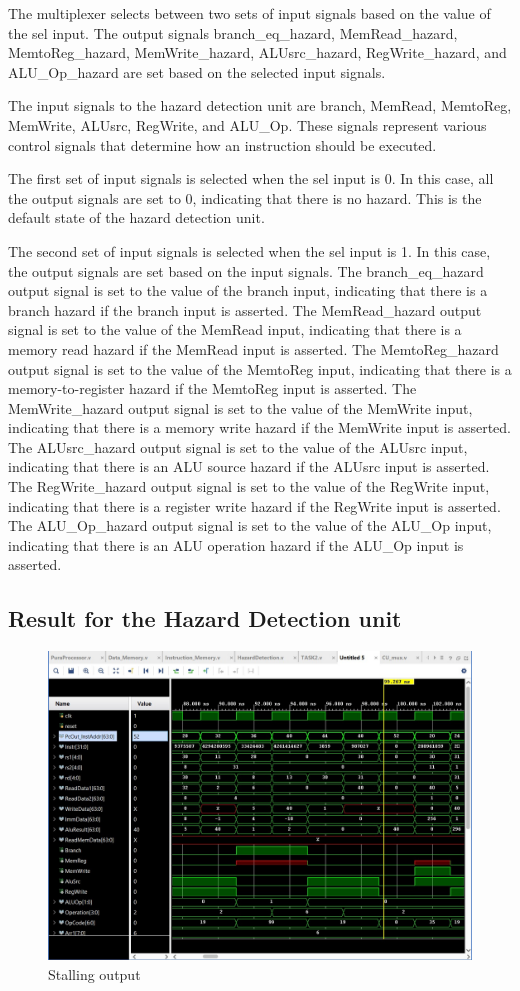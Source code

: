 \documentclass{article}
\begin{document}
The multiplexer selects between two sets of input signals based on the value of the sel input. The output signals branch\_eq\_hazard, MemRead\_hazard, MemtoReg\_hazard, MemWrite\_hazard, ALUsrc\_hazard, RegWrite\_hazard, and ALU\_Op\_hazard are set based on the selected input signals.

The input signals to the hazard detection unit are branch, MemRead, MemtoReg, MemWrite, ALUsrc, RegWrite, and ALU\_Op. These signals represent various control signals that determine how an instruction should be executed.

The first set of input signals is selected when the sel input is 0. In this case, all the output signals are set to 0, indicating that there is no hazard. This is the default state of the hazard detection unit.

The second set of input signals is selected when the sel input is 1. In this case, the output signals are set based on the input signals. The branch\_eq\_hazard output signal is set to the value of the branch input, indicating that there is a branch hazard if the branch input is asserted. The MemRead\_hazard output signal is set to the value of the MemRead input, indicating that there is a memory read hazard if the MemRead input is asserted. The MemtoReg\_hazard output signal is set to the value of the MemtoReg input, indicating that there is a memory-to-register hazard if the MemtoReg input is asserted. The MemWrite\_hazard output signal is set to the value of the MemWrite input, indicating that there is a memory write hazard if the MemWrite input is asserted. The ALUsrc\_hazard output signal is set to the value of the ALUsrc input, indicating that there is an ALU source hazard if the ALUsrc input is asserted. The RegWrite\_hazard output signal is set to the value of the RegWrite input, indicating that there is a register write hazard if the RegWrite input is asserted. The ALU\_Op\_hazard output signal is set to the value of the ALU\_Op input, indicating that there is an ALU operation hazard if the ALU\_Op input is asserted.

\subsection{Result for the Hazard Detection unit}

\begin{figure}[!h]
    \centering
    \includegraphics*[width = 9 cm]{stallingfinalsorted.jpeg}
    \caption{Stalling output}
    \label{fig:label6}
\end{figure}
\end{document}
